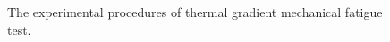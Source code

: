 \begin{figure}[!htp]
\caption{The experimental procedures of thermal gradient mechanical fatigue test.}
\label{Fig:tgmf_code}
\end{figure}



